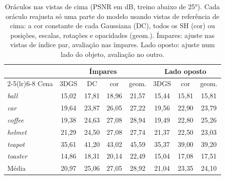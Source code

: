 \begin{table}[t]
\centering
\caption{Oráculos nas vistas de cima (PSNR em dB, treino abaixo de 25°). Cada oráculo reajusta só uma parte do modelo usando vistas de referência de cima: a cor constante de cada Gaussiana (DC), todos os SH (cor) ou posições, escalas, rotações e opacidades (geom.). Ímpares: ajuste nas vistas de índice par, avaliação nas ímpares. Lado oposto: ajuste num lado do objeto, avaliação no outro.}
\label{tab:oraculos25}
\setlength{\tabcolsep}{3pt}
\footnotesize
\begin{tabular}{l cccc ccc}
\toprule
 & \multicolumn{4}{c}{Ímpares} & \multicolumn{3}{c}{Lado oposto} \\
\cmidrule(lr){2-5}\cmidrule(lr){6-8}
Cena & 3DGS & DC & cor & geom. & 3DGS & cor & geom. \\
\midrule
\textit{ball} & 15{,}02 & 17{,}81 & 18{,}96 & 21{,}57 & 15{,}44 & 15{,}81 & 15{,}81 \\
\textit{car} & 19{,}64 & 23{,}87 & 26{,}05 & 27{,}22 & 19{,}56 & 22{,}90 & 23{,}79 \\
\textit{coffee} & 19{,}38 & 24{,}63 & 27{,}08 & 28{,}94 & 19{,}49 & 22{,}80 & 25{,}26 \\
\textit{helmet} & 21{,}29 & 24{,}50 & 27{,}08 & 27{,}74 & 21{,}37 & 22{,}50 & 23{,}03 \\
\textit{teapot} & 35{,}61 & 41{,}20 & 43{,}02 & 45{,}59 & 35{,}37 & 39{,}00 & 39{,}20 \\
\textit{toaster} & 14{,}86 & 18{,}31 & 20{,}14 & 22{,}49 & 15{,}04 & 17{,}08 & 17{,}51 \\
\midrule
Média & 20{,}97 & 25{,}06 & 27{,}05 & 28{,}92 & 21{,}04 & 23{,}35 & 24{,}10 \\
\bottomrule
\end{tabular}
\end{table}
